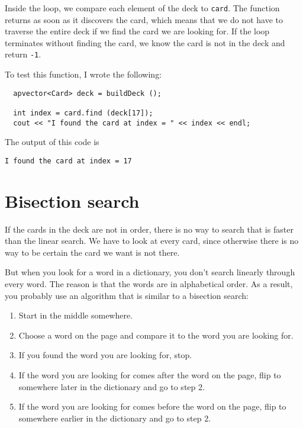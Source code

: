 Inside the loop, we compare each element of the deck to
{\tt card}.  The function returns as soon as it discovers
the card, which means that we do not have to traverse the entire
deck if we find the card we are looking for.  If the loop terminates
without finding the card, we know the card is not in the deck
and return {\tt -1}.


To test this function, I wrote the following:

\begin{verbatim}
  apvector<Card> deck = buildDeck ();

  int index = card.find (deck[17]);
  cout << "I found the card at index = " << index << endl;
\end{verbatim}
%
The output of this code is

\begin{verbatim}
I found the card at index = 17
\end{verbatim}
%


\section{Bisection search}

If the cards in the deck are not in order, there is no way to search
that is faster than the linear search.  We have to look at every card,
since otherwise there is no way to be certain the card we want is not
there.

But when you look for a word in a dictionary, you don't search
linearly through every word.  The reason is that the words are in
alphabetical order.  As a result, you probably use an algorithm that
is similar to a bisection search:

\begin {enumerate}

\item Start in the middle somewhere.

\item Choose a word on the page and compare it to the word you
are looking for.

\item If you found the word you are looking for, stop.

\item If the word you are looking for comes after the word on
the page, flip to somewhere later in the dictionary and go to
step 2.

\item If the word you are looking for comes before the word on
the page, flip to somewhere earlier in the dictionary and go to
step 2.

\end {enumerate}

